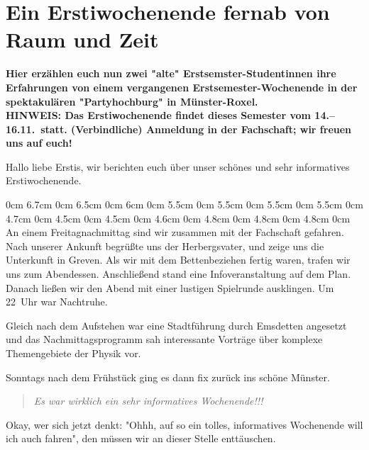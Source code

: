\section{Ein Erstiwochenende fernab von Raum und Zeit}
\textbf{Hier erzählen euch nun zwei "alte" Erstsemster-Studentinnen ihre Erfahrungen von einem vergangenen Erstsemester-Wochenende in der spektakulären "Partyhochburg" in Münster-Roxel.\\
HINWEIS: Das Erstiwochenende findet dieses Semester vom 14.--16.11.\ statt. (Verbindliche) Anmeldung in der Fachschaft; wir freuen uns auf euch!}
\begin{multicols}{2}
Hallo liebe Erstis, wir berichten euch über unser schönes und sehr informatives Erstiwochenende.



0cm 6.7cm
0cm 6.5cm
0cm 6cm
0cm 5.5cm
0cm 5.5cm
0cm 5.5cm
0cm 5.5cm
0cm 4.7cm
0cm 4.5cm
0cm 4.5cm
0cm 4.6cm
0cm 4.8cm
0cm 4.8cm
0cm 4.8cm
0cm \columnwidth
An einem Freitagnachmittag sind wir zusammen mit der Fachschaft gefahren. Nach unserer Ankunft begrüßte uns der Herbergsvater, und zeige uns die Unterkunft in Greven. Als wir mit dem Bettenbeziehen fertig waren, trafen wir uns zum Abendessen. Anschließend stand eine Infoveranstaltung auf dem Plan. Danach ließen wir den Abend mit einer lustigen Spielrunde ausklingen. Um 22~Uhr war Nachtruhe.

Gleich nach dem Aufstehen war eine Stadtführung durch Emsdetten angesetzt und das Nachmittagsprogramm sah interessante Vorträge über komplexe Themengebiete der Physik vor.

Sonntags nach dem Frühstück ging es dann fix zurück ins schöne Münster.

\begin{quote}
\textit{Es war wirklich ein sehr informatives Wochenende!!!}
\end{quote}

Okay, wer sich jetzt denkt: "Ohhh, auf so ein tolles, informatives Wochenende will ich auch fahren", den müssen wir an dieser Stelle enttäuschen.


\end{multicols}
